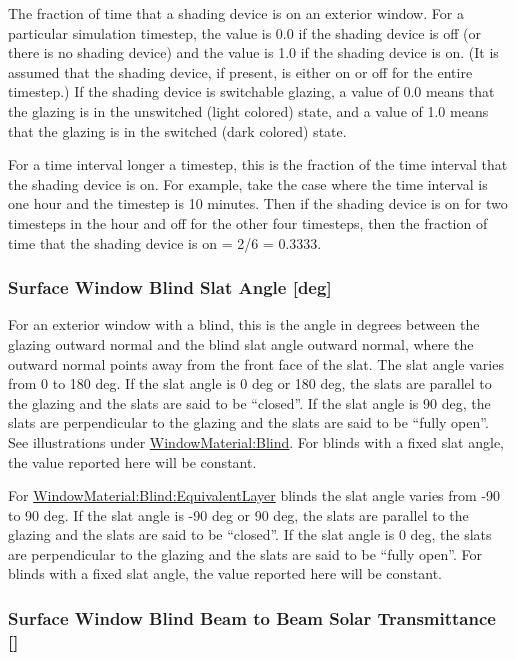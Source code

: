 The fraction of time that a shading device is on an exterior window. For a particular simulation timestep, the value is 0.0 if the shading device is off (or there is no shading device) and the value is 1.0 if the shading device is on. (It is assumed that the shading device, if present, is either on or off for the entire timestep.) If the shading device is switchable glazing, a value of 0.0 means that the glazing is in the unswitched (light colored) state, and a value of 1.0 means that the glazing is in the switched (dark colored) state.

For a time interval longer a timestep, this is the fraction of the time interval that the shading device is on. For example, take the case where the time interval is one hour and the timestep is 10 minutes. Then if the shading device is on for two timesteps in the hour and off for the other four timesteps, then the fraction of time that the shading device is on = 2/6 = 0.3333.

\subsubsection{Surface Window Blind Slat Angle {[}deg{]}}\label{surface-window-blind-slat-angle-deg}

For an exterior window with a blind, this is the angle in degrees between the glazing outward normal and the blind slat angle outward normal, where the outward normal points away from the front face of the slat. The slat angle varies from 0 to 180 deg. If the slat angle is 0 deg or 180 deg, the slats are parallel to the glazing and the slats are said to be ``closed''. If the slat angle is 90 deg, the slats are perpendicular to the glazing and the slats are said to be ``fully open''. See illustrations under \hyperref[windowmaterialblind]{WindowMaterial:Blind}. For blinds with a fixed slat angle, the value reported here will be constant.

For \hyperref[windowmaterialblindequivalentlayer]{WindowMaterial:Blind:EquivalentLayer} blinds the slat angle varies from -90 to 90 deg. If the slat angle is -90 deg or 90 deg, the slats are parallel to the glazing and the slats are said to be ``closed''. If the slat angle is 0 deg, the slats are perpendicular to the glazing and the slats are said to be ``fully open''. For blinds with a fixed slat angle, the value reported here will be constant.


\subsubsection{Surface Window Blind Beam to Beam Solar Transmittance {[]}}\label{surface-window-blind-beam-to-beam-solar-transmittance}

